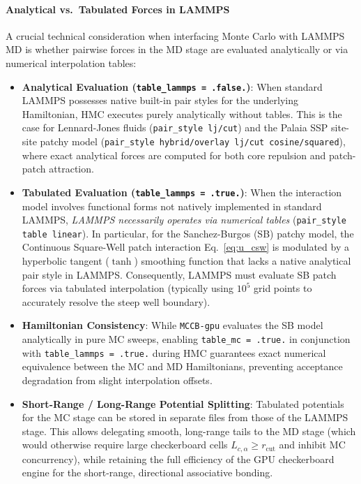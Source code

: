 \documentclass[final,5p,times,twocolumn]{elsarticle}
\begin{document}
\paragraph{Analytical vs.\ Tabulated Forces in LAMMPS}
A crucial technical consideration when interfacing Monte Carlo with
LAMMPS MD is whether pairwise forces in the MD stage are evaluated
analytically or via numerical interpolation tables:
\begin{itemize}
    \item \textbf{Analytical Evaluation (\texttt{table\_lammps = .false.})}:
      When standard LAMMPS possesses native built-in pair styles for the
      underlying Hamiltonian, HMC executes purely analytically without
      tables. This is the case for Lennard-Jones fluids
      (\texttt{pair\_style lj/cut}) and the Palaia SSP site-site patchy
      model (\texttt{pair\_style hybrid/overlay lj/cut cosine/squared}),
      where exact analytical forces are computed for both core repulsion
      and patch-patch attraction.
    \item \textbf{Tabulated Evaluation (\texttt{table\_lammps = .true.})}:
      When the interaction model involves functional forms not natively
      implemented in standard LAMMPS, \textit{LAMMPS necessarily
      operates via numerical tables} (\texttt{pair\_style table
      linear}). In particular, for the Sanchez-Burgos (SB) patchy model,
      the Continuous Square-Well patch interaction Eq.~\eqref{eq:u_csw}
      is modulated by a hyperbolic tangent ($\tanh$) smoothing function
      that lacks a native analytical pair style in LAMMPS. Consequently,
      LAMMPS must evaluate SB patch forces via tabulated interpolation
      (typically using $10^5$ grid points to accurately resolve the
      steep well boundary).
    \item \textbf{Hamiltonian Consistency}: While \texttt{MCCB-gpu}
      evaluates the SB model analytically in pure MC sweeps, enabling
      \texttt{table\_mc = .true.} in conjunction with
      \texttt{table\_lammps = .true.} during HMC guarantees exact
      numerical equivalence between the MC and MD Hamiltonians,
      preventing acceptance degradation from slight interpolation offsets.
    \item \textbf{Short-Range / Long-Range Potential Splitting}:
      Tabulated potentials for the MC stage can be stored in separate
      files from those of the LAMMPS stage. This allows delegating
      smooth, long-range tails to the MD stage (which would otherwise
      require large checkerboard cells $L_{c,\alpha} \ge r_{\text{cut}}$
      and inhibit MC concurrency), while retaining the full efficiency of
      the GPU checkerboard engine for the short-range, directional
      associative bonding.
\end{itemize} 
\end{document}
